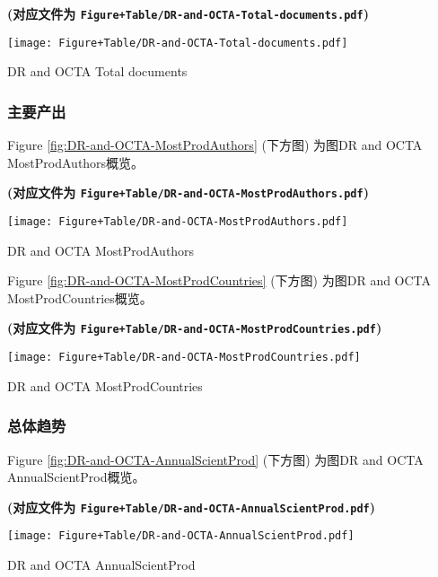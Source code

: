 \documentclass[
]{article}
\begin{document}
\textbf{(对应文件为 \texttt{Figure+Table/DR-and-OCTA-Total-documents.pdf})}

\def\@captype{figure}
\begin{center}
\texttt{[image: Figure+Table/DR-and-OCTA-Total-documents.pdf]}
\caption{DR and OCTA Total documents}\label{fig:DR-and-OCTA-Total-documents}
\end{center}

\hypertarget{ux4e3bux8981ux4ea7ux51fa}{%
\subsubsection{主要产出}\label{ux4e3bux8981ux4ea7ux51fa}}

Figure \ref{fig:DR-and-OCTA-MostProdAuthors} (下方图) 为图DR and OCTA MostProdAuthors概览。

\textbf{(对应文件为 \texttt{Figure+Table/DR-and-OCTA-MostProdAuthors.pdf})}

\def\@captype{figure}
\begin{center}
\texttt{[image: Figure+Table/DR-and-OCTA-MostProdAuthors.pdf]}
\caption{DR and OCTA MostProdAuthors}\label{fig:DR-and-OCTA-MostProdAuthors}
\end{center}

Figure \ref{fig:DR-and-OCTA-MostProdCountries} (下方图) 为图DR and OCTA MostProdCountries概览。

\textbf{(对应文件为 \texttt{Figure+Table/DR-and-OCTA-MostProdCountries.pdf})}

\def\@captype{figure}
\begin{center}
\texttt{[image: Figure+Table/DR-and-OCTA-MostProdCountries.pdf]}
\caption{DR and OCTA MostProdCountries}\label{fig:DR-and-OCTA-MostProdCountries}
\end{center}

\hypertarget{ux603bux4f53ux8d8bux52bf}{%
\subsubsection{总体趋势}\label{ux603bux4f53ux8d8bux52bf}}

Figure \ref{fig:DR-and-OCTA-AnnualScientProd} (下方图) 为图DR and OCTA AnnualScientProd概览。

\textbf{(对应文件为 \texttt{Figure+Table/DR-and-OCTA-AnnualScientProd.pdf})}

\def\@captype{figure}
\begin{center}
\texttt{[image: Figure+Table/DR-and-OCTA-AnnualScientProd.pdf]}
\caption{DR and OCTA AnnualScientProd}\label{fig:DR-and-OCTA-AnnualScientProd}
\end{center}
\end{document}
